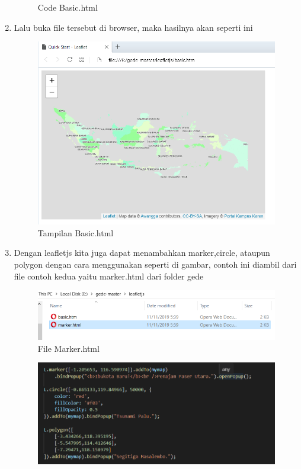 \begin{enumerate}
\begin{figure}[H]
		\centering
		\caption{Code Basic.html}
	\end{figure}
    \item Lalu buka file tersebut di browser, maka hasilnya akan seperti ini
    \hfill\break
    \begin{figure}[H]
		\includegraphics[width=12cm]{figures/Tugas5/1174084/3.png}
		\centering
		\caption{Tampilan Basic.html}
	\end{figure}
    \item Dengan leafletjs kita juga dapat menambahkan marker,circle, ataupun polygon dengan cara menggunakan seperti di gambar, contoh ini diambil dari file contoh kedua yaitu marker.html dari folder gede 
    \hfill\break
    \begin{figure}[H]
		\includegraphics[width=12cm]{figures/Tugas5/1174084/4.png}
		\centering
		\caption{File Marker.html}
	\end{figure}
	\begin{figure}[H]
		\includegraphics[width=12cm]{figures/Tugas5/1174084/6.png}

\end{figure}
\end{enumerate}
